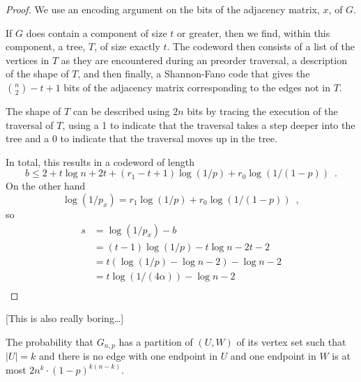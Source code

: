 \documentclass{patmorin}
\begin{document}
\begin{proof}
  We use an encoding argument on the bits of the adjacency matrix, $x$,
  of $G$.

  If $G$ does contain a component of size $t$ or greater, then we
  find, within this component, a tree, $T$, of size exactly $t$.  The
  codeword then consists of a list of the vertices in $T$ as they are
  encountered during an preorder traversal, a description of the shape
  of $T$, and then finally, a Shannon-Fano code that gives the
  $\binom{n}{2}-t+1$ bits of the adjacency matrix corresponding to the
  edges not in $T$.

  The shape of $T$ can be described using $2n$ bits by tracing the
  execution of the traversal of $T$, using a 1 to indicate that the
  traversal takes a step deeper into the tree and a 0 to indicate that
  the traversal moves up in the tree.

  In total, this results in a codeword of length
  \[   
    b \le 2 + t\log n + 2t + (r_1-t+1)\log(1/p) + r_0\log(1/(1-p))  \enspace . 
  \]
  On the other hand
  \[   
     \log (1/p_x) = r_1\log(1/p) + r_0\log(1/(1-p)) \enspace ,
  \]
  so
  \begin{align*}
     s & = \log(1/p_x) - b \\
       & =  (t-1)\log(1/p) - t\log n - 2t - 2 \\
       & = t(\log(1/p)-\log n - 2) - \log n - 2 \\
       & = t\log(1/(4\alpha)) - \log n - 2 \\
  \end{align*}
\end{proof}

[This is also really boring\ldots]

\begin{lem}
  The probability that $G_{n,p}$ has a partition of $(U,W)$ of its vertex
  set such that $|U|=k$ and there is no edge with one endpoint in $U$
  and one endpoint in $W$ is at most $2n^k\cdot (1-p)^{k(n-k)}$.
\end{lem}
\end{document}
